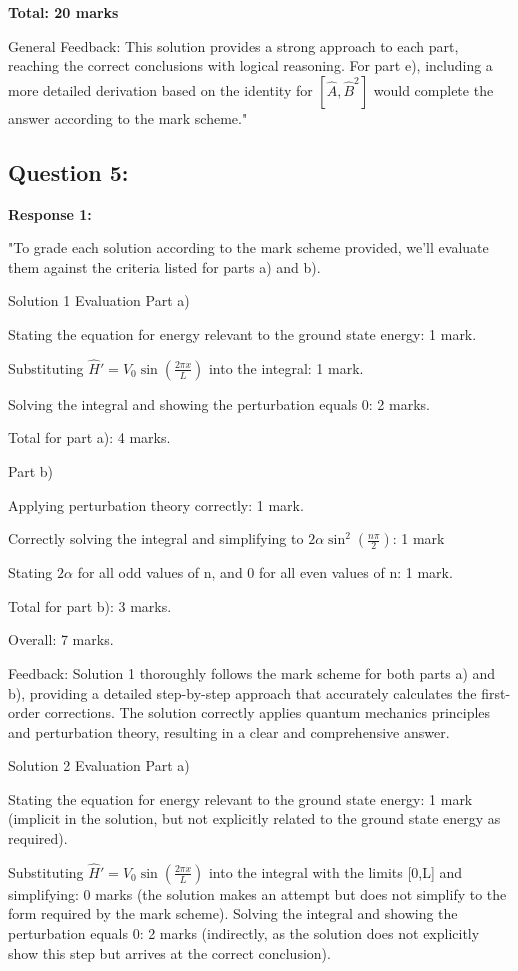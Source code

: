 \documentclass[a4paper,11pt]{article}
\begin{document}
\textbf{Total: 20 marks}

General Feedback: This solution provides a strong approach to each part, reaching the correct conclusions with logical reasoning. For part e), including a more detailed derivation based on the identity for \( [\hat{A}, \hat{B}^2] \) would complete the answer according to the mark scheme."

\subsection*{Question 5:}

\textbf{Response 1:}

"To grade each solution according to the mark scheme provided, we'll evaluate them against the criteria listed for parts a) and b).

Solution 1 Evaluation
Part a)

Stating the equation for energy relevant to the ground state energy: 1 mark.

Substituting \(\hat{H}' = V_0 \sin(\frac{2 \pi x}{L})\) into the integral: 1 mark.

Solving the integral and showing the perturbation equals 0: 2 marks.

Total for part a): 4 marks.

Part b)

Applying perturbation theory correctly: 1 mark.

Correctly solving the integral and simplifying to \( 2\alpha \sin^2(\frac{n\pi}{2})\): 1 mark

Stating \(2\alpha\) for all odd values of n, and 0 for all even values of n: 1 mark.

Total for part b): 3 marks.

Overall: 7 marks.

Feedback: Solution 1 thoroughly follows the mark scheme for both parts a) and b), providing a detailed step-by-step approach that accurately calculates the first-order corrections. The solution correctly applies quantum mechanics principles and perturbation theory, resulting in a clear and comprehensive answer.

Solution 2 Evaluation
Part a)

Stating the equation for energy relevant to the ground state energy: 1 mark (implicit in the solution, but not explicitly related to the ground state energy as required).

Substituting \(\hat{H}' = V_0 \sin(\frac{2 \pi x}{L})\) into the integral with the limits [0,L] and simplifying: 0 marks (the solution makes an attempt but does not simplify to the form required by the mark scheme).
Solving the integral and showing the perturbation equals 0: 2 marks (indirectly, as the solution does not explicitly show this step but arrives at the correct conclusion).
\end{document}
